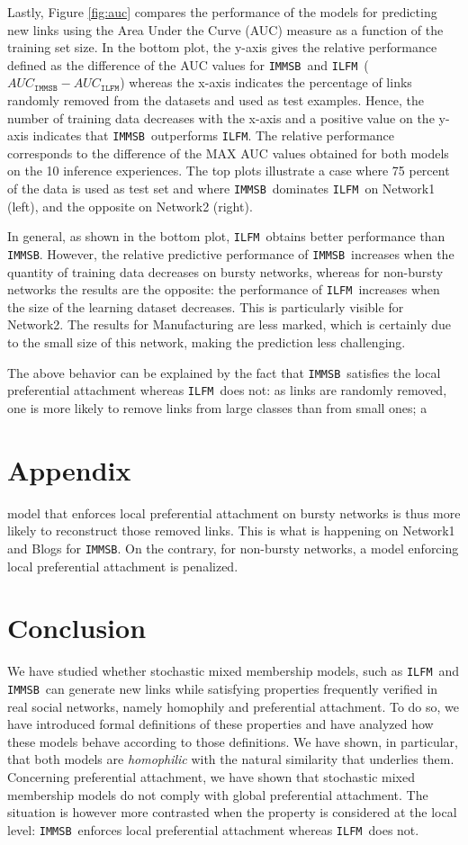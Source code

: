 \documentclass{llncs}
\newcommand{\ifm}{\texttt{ILFM}}
\newcommand{\imb}{\texttt{IMMSB}}
\begin{document}
Lastly, Figure \ref{fig:auc} compares the performance of the models for predicting new links using the Area Under the Curve (AUC) measure as a function of the training set size. In the bottom plot, the y-axis gives the relative performance defined as the difference of the AUC values for \imb\ and \ifm\ ($AUC_{\imb} - AUC_{\ifm}$) whereas the x-axis indicates the percentage of links randomly removed from the datasets and used as test examples. Hence, the number of training data decreases with the x-axis and a positive value on the y-axis indicates that \imb\ outperforms \ifm.  The relative performance corresponds to the difference of the MAX AUC values obtained for both models on the 10 inference experiences. The top plots illustrate a case where 75 percent of the data is used as test set and where \imb\ dominates \ifm\ on Network1 (left), and the opposite on Network2 (right).

In general, as shown in the bottom plot, \ifm\ obtains better performance than \imb. However, the relative predictive performance of \imb\  increases  when the quantity of training data decreases on bursty networks, whereas for non-bursty networks the results are the opposite: the performance of \ifm\ increases when the size of the learning dataset decreases. This is particularly visible for Network2. The results for Manufacturing are less marked, which is certainly due to the small size of this network, making the prediction less challenging.

The above behavior can be explained by the fact that \imb\ satisfies the local preferential attachment whereas \ifm\ does not: as links are randomly removed, one is more likely to remove links from large classes than from small ones; a \section{Appendix}
\label{sec:append}model that enforces local preferential attachment on bursty networks is thus more likely to reconstruct those removed links. This is what is happening on Network1 and Blogs for \imb. On the contrary, for non-bursty networks, a model enforcing local preferential attachment is penalized.


\section{Conclusion}

We have studied whether stochastic mixed membership models, such as \ifm\ and \imb\, can generate new links while satisfying properties frequently verified in real  social networks, namely homophily and preferential attachment. To do so, we have introduced formal definitions of these properties and have analyzed how these models behave according to those definitions. We have shown, in particular, that both models are \textit{homophilic} with the natural similarity that underlies them. Concerning preferential attachment, we have shown that stochastic mixed membership models do not comply with global preferential attachment. The situation is however more contrasted when the property is considered at the local level: \imb\ enforces local preferential attachment whereas \ifm\ does not.
\end{document}
